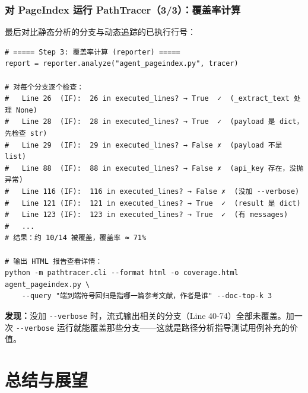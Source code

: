 \documentclass[presentation,aspectratio=169,fontset=none]{ctexbeamer}
\begin{document}
\begin{frame}[fragile]
\frametitle{对 PageIndex 运行 PathTracer（3/3）：覆盖率计算}
{\scriptsize 最后对比静态分析的分支与动态追踪的已执行行号：}

\vspace{0.05cm}
{\tiny
\begin{verbatim}
# ===== Step 3: 覆盖率计算 (reporter) =====
report = reporter.analyze("agent_pageindex.py", tracer)

# 对每个分支逐个检查：
#   Line 26  (IF):  26 in executed_lines? → True  ✓  (_extract_text 处理 None)
#   Line 28  (IF):  28 in executed_lines? → True  ✓  (payload 是 dict，先检查 str)
#   Line 29  (IF):  29 in executed_lines? → False ✗  (payload 不是 list)
#   Line 88  (IF):  88 in executed_lines? → False ✗  (api_key 存在，没抛异常)
#   Line 116 (IF):  116 in executed_lines? → False ✗  (没加 --verbose)
#   Line 121 (IF):  121 in executed_lines? → True  ✓  (result 是 dict)
#   Line 123 (IF):  123 in executed_lines? → True  ✓  (有 messages)
#   ...
# 结果：约 10/14 被覆盖，覆盖率 ≈ 71%

# 输出 HTML 报告查看详情：
python -m pathtracer.cli --format html -o coverage.html agent_pageindex.py \
    --query "端到端符号回归是指哪一篇参考文献，作者是谁" --doc-top-k 3
\end{verbatim}}

\vspace{0.05cm}
{\scriptsize \textbf{发现：}没加 \texttt{-{}-verbose} 时，流式输出相关的分支（Line 40-74）全部未覆盖。加一次 \texttt{-{}-verbose} 运行就能覆盖那些分支——这就是路径分析指导测试用例补充的价值。}
\end{frame}

\section{总结与展望}
\end{document}
